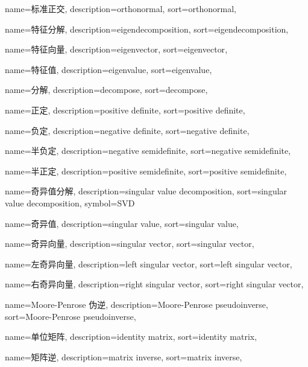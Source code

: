 {
  name=标准正交,
  description={orthonormal},
  sort={orthonormal},
}

{
  name=特征分解,
  description={eigendecomposition},
  sort={eigendecomposition},
}

{
  name=特征向量,
  description={eigenvector},
  sort={eigenvector},
}

{
  name=特征值,
  description={eigenvalue},
  sort={eigenvalue},
}

{
  name=分解,
  description={decompose},
  sort={decompose},
}

{
  name=正定,
  description={positive definite},
  sort={positive definite},
}

{
  name=负定,
  description={negative definite},
  sort={negative definite},
}

{
  name=半负定,
  description={negative semidefinite},
  sort={negative semidefinite},
}

{
  name=半正定,
  description={positive semidefinite},
  sort={positive semidefinite},
}

{
  name=奇异值分解,
  description={singular value decomposition},
  sort={singular value decomposition},
  symbol={SVD}
}

{
  name=奇异值,
  description={singular value},
  sort={singular value},
}

{
  name=奇异向量,
  description={singular vector},
  sort={singular vector},
}

{
  name=左奇异向量,
  description={left singular vector},
  sort={left singular vector},
}

{
  name=右奇异向量,
  description={right singular vector},
  sort={right singular vector},
}

{
  name=Moore-Penrose 伪逆,
  description={Moore-Penrose pseudoinverse},
  sort={Moore-Penrose pseudoinverse},
}

{
  name=单位矩阵,
  description={identity matrix},
  sort={identity matrix},
}

{
  name=矩阵逆,
  description={matrix inverse},
  sort={matrix inverse},
}

